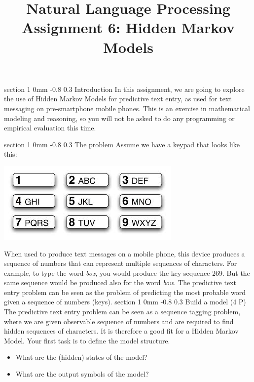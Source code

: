 \documentclass[11pt]{article}
\title{{\LARGE Natural Language Processing}\\[1.5mm]{\large Assignment 6: Hidden Markov Models}}
\author{}
\date{} %
\makeatletter
\newcommand{\newsec}[2]{\section{#1}\label{sec:#2}\noindent}
\renewcommand{\section}{\@startsection
{section}%
{1}%
{0mm}%
{-0.8\baselineskip}%
{0.3\baselineskip}%
{\bfseries\large}}%
\makeatother
\begin{document}
 

\maketitle
\vspace{-2mm}
\newsec{Introduction}{intro}%
In this assignment, we are going to explore the use of Hidden Markov Models for predictive text entry, as used for text messaging on pre-smartphone mobile phones.
This is an exercise in mathematical modeling and reasoning, so you will not be asked to do any programming or empirical evaluation this time.

\newsec{The problem}{problem}%
Assume we have a keypad that looks like this:
\begin{center}
\includegraphics[scale=0.5]{keypad.jpeg}
\end{center}
When used to produce text messages on a mobile phone, this device produces a sequence of numbers that can represent multiple sequences of characters. 
For example, to type the word {\em box}, you would produce the key sequence 269. But the same sequence would be produced also for the word {\em bow}. 
The predictive text entry problem can be seen as the problem of predicting the most probable word given a sequence of numbers (keys).
\newsec{Build a model (4 P)}{model}%
The predictive text entry problem can be seen as a sequence tagging problem, where we are given observable sequence of numbers and are required to
find hidden sequences of characters. It is therefore a good fit for a Hidden Markov Model. Your first task is to define the model structure.
\begin{itemize}[noitemsep,topsep=0.2cm]
\item What are the (hidden) states of the model?
\item What are the output symbols of the model?
\end{itemize}
\end{document}
